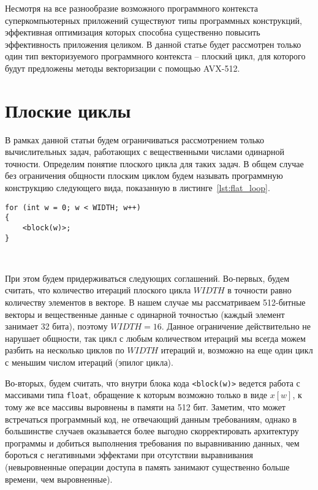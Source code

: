 \documentclass[
11pt,%
tightenlines,%
twoside,%
onecolumn,%
nofloats,%
nobibnotes,%
nofootinbib,%
superscriptaddress,%
noshowpacs,%
centertags]%
{revtex4}
\begin{document}
Несмотря на все разнообразие возможного программного контекста суперкомпьютерных приложений существуют типы программных конструкций, эффективная оптимизация которых способна существенно повысить эффективность приложения целиком.
В данной статье будет рассмотрен только один тип векторизуемого программного контекста -- плоский цикл, для которого будут предложены методы векторизации с помощью AVX-512.

\section{Плоские циклы}

В рамках данной статьи будем ограничиваться рассмотрением только вычислительных задач, работающих с вещественными числами одинарной точности.
Определим понятие плоского цикла для таких задач.
В общем случае без ограничения общности плоским циклом будем называть программную конструкцию следующего вида, показанную в листинге~\ref{lst:flat_loop}.

\begin{lstlisting}[caption={Общий вид плоского цикла.},label={lst:flat_loop}]
for (int w = 0; w < WIDTH; w++)
{
    <block(w)>;
}
\end{lstlisting}

\

При этом будем придерживаться следующих соглашений.
Во-первых, будем считать, что количество итераций плоского цикла $WIDTH$ в точности равно количеству элементов в векторе.
В нашем случае мы рассматриваем 512-битные векторы и вещественные данные с одинарной точностью (каждый элемент занимает 32 бита), поэтому $WIDTH = 16$.
Данное ограничение действительно не нарушает общности, так цикл с любым количеством итераций мы всегда можем разбить на несколько циклов по $WIDTH$ итераций и, возможно на еще один цикл с меньшим числом итераций (эпилог цикла).

Во-вторых, будем считать, что внутри блока кода \texttt{<block(w)>} ведется работа с массивами типа \texttt{float}, обращение к которым возможно только в виде $x[w]$, к тому же все массивы выровнены в памяти на 512 бит.
Заметим, что может встречаться программный код, не отвечающий данным требованиям, однако в большинстве случаев оказывается более выгодно скорректировать архитектуру программы и добиться выполнения требования по выравниванию данных, чем бороться с негативными эффектами при отсутствии выравнивания (невыровненные операции доступа в память занимают существенно больше времени, чем выровненные).
\end{document}
